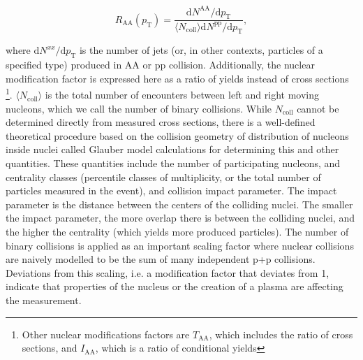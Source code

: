   \begin{equation}
    R_\mathrm{AA}(p_\mathrm{T}) = \frac{\mathrm{d}N^\mathrm{AA}/\mathrm{d}p_\mathrm{T}}{\langle N_\mathrm{coll}\rangle\mathrm{d}N^\mathrm{pp}/\mathrm{d}p_\mathrm{T}},
    \label{eq:raa}
  \end{equation}

where $\mathrm{d}N^{xx}/\mathrm{d}p_\mathrm{T}$ is the number of jets (or, in other contexts, particles of a specified type) produced in AA or pp collision. Additionally, the nuclear modification factor is expressed here as a ratio of yields instead of cross sections \footnote{Other nuclear modifications factors are $T_\mathrm{AA}$, which includes the ratio of cross sections, and $I_\mathrm{AA}$, which is a ratio of conditional yields}. $\langle N_\mathrm{coll}\rangle$ is the total number of encounters between left and right moving nucleons, which we call the number of binary collisions. While $N_\mathrm{coll}$ cannot be determined directly from measured cross sections, there is a well-defined theoretical procedure based on the collision geometry of distribution of nucleons inside nuclei called Glauber model calculations \cite{doi:10.1146/annurev.nucl.57.090506.123020} for determining this and other quantities. These quantities include the  number of participating nucleons, and centrality classes (percentile classes of multiplicity, or the total number of particles measured in the event), and collision impact parameter. The impact parameter is the distance between the centers of the colliding nuclei. The smaller the impact parameter, the more overlap there is between the colliding nuclei, and the higher the centrality (which yields more produced particles). The number of binary collisions is applied as an important scaling factor where nuclear collisions are naively modelled to be the sum of many independent p+p collisions. Deviations from this scaling, i.e. a modification factor that deviates from 1, indicate that properties of the nucleus or the creation of a plasma are affecting the measurement.

